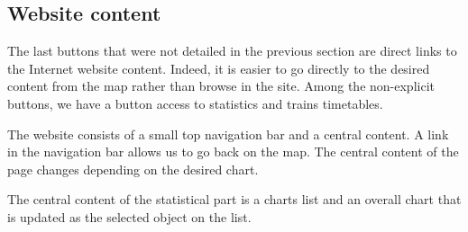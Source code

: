 
\subsection{Website content}


The last buttons that were not detailed in the previous section are direct links to the Internet website content. Indeed, it is easier to go directly to the desired content from the map rather than browse in the site. Among the non-explicit buttons, we have a button access to statistics and trains timetables.




The website consists of a small top navigation bar and a central content. A link in the navigation bar allows us to go back on the map. The central content of the page changes depending on the desired chart.

The central content of the statistical part is a charts list and an overall chart that is updated as the selected object on the list.

